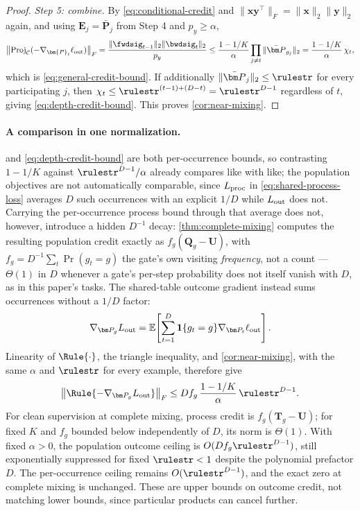 \begin{proof}
\emph{Step 5: combine.} By \cref{eq:conditional-credit} and
$\|\bm x\bm y^\top\|_F=\|\bm x\|_2\|\bm y\|_2$ again, and using
$\bm E_j=\bar{\bm P}_j$ from Step 4 and $p_y\ge\alpha$,
\[
 \left\|\operatorname{Proj}_{\mathcal C}(-\nabla_{\bm{P}_t}\ell_{\rm out})\right\|_F
 =\frac{\|\fwdsig_{t-1}\|_2\|\bwdsig_t\|_2}{p_y}
 \le\frac{1-1/K}{\alpha}\prod_{j\ne t}\|\bar{\bm P}_{g_j}\|_2
 =\frac{1-1/K}{\alpha}\,\chi_t,
\]
which is \cref{eq:general-credit-bound}. If additionally
$\|\bar{\bm P}_j\|_2\le\rulestr$ for every participating $j$, then
$\chi_t\le\rulestr^{(t-1)+(D-t)}=\rulestr^{D-1}$ regardless of $t$, giving
\cref{eq:depth-credit-bound}. This proves \cref{cor:near-mixing}.
\end{proof}

\paragraph{A comparison in one normalization.} 
and \cref{eq:depth-credit-bound} are both per-occurrence bounds, so contrasting
$1-1/K$ against $\rulestr^{D-1}/\alpha$ already compares like with like; the
population objectives are not automatically comparable, since $L_{\rm proc}$
in \cref{eq:shared-process-loss} averages $D$ such occurrences with an
explicit $1/D$ while $L_{\rm out}$ does not. Carrying the per-occurrence
process bound through that average does not, however, introduce a hidden
$D^{-1}$ decay: \cref{thm:complete-mixing} computes the resulting population
credit exactly as $f_g(\bm{Q}_g-\bm{U})$, with $f_g=D^{-1}\sum_t\Pr(g_t=g)$ the
gate's own visiting \emph{frequency}, not a count --- $\Theta(1)$ in $D$
whenever a gate's per-step probability does not itself vanish with $D$, as
in this paper's tasks. The shared-table outcome gradient instead sums
occurrences without a $1/D$ factor:
\[
 \nabla_{\bm P_g}L_{\rm out}
 =\mathbb E\!\left[\sum_{t=1}^D\mathbf1\{g_t=g\}
      \nabla_{\bm P_t}\ell_{\rm out}\right].
\]
Linearity of $\Rule{\cdot}$, the triangle inequality, and
\cref{cor:near-mixing}, with the same $\alpha$ and $\rulestr$ for every
example, therefore give
\begin{equation}
 \left\|\Rule{-\nabla_{\bm P_g}L_{\rm out}}\right\|_F
 \le D f_g\,\frac{1-1/K}{\alpha}\,\rulestr^{D-1}.
 \label{eq:population-outcome-credit-bound}
\end{equation}
For clean supervision at complete mixing, process credit is
$f_g(\bm T_g-\bm U)$; for fixed $K$ and $f_g$ bounded below independently
of $D$, its norm is $\Theta(1)$. With fixed $\alpha>0$, the population
outcome ceiling is $O(D f_g\rulestr^{D-1})$, still exponentially suppressed
for fixed $\rulestr<1$ despite the polynomial prefactor $D$. The
per-occurrence ceiling remains $O(\rulestr^{D-1})$, and the exact zero at
complete mixing is unchanged. These are upper bounds on outcome credit,
not matching lower bounds, since particular products can cancel further.

